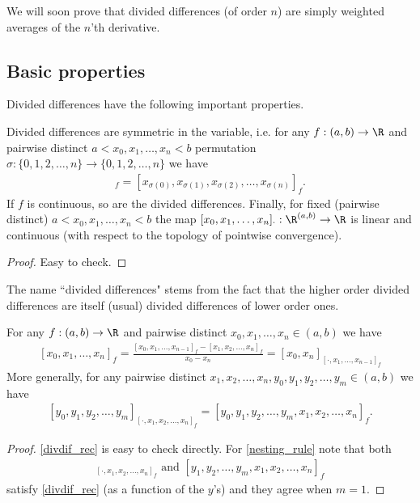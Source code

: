 We will soon prove that divided differences (of order $n$) are simply weighted averages of the $n$'th derivative.

\subsection{Basic properties}

Divided differences have the following important properties.

\begin{prop}
	Divided differences are symmetric in the variable, i.e. for any $f : (a, b) \to \R$ and pairwise distinct $a < x_{0}, x_{1}, \ldots, x_{n} < b$ permutation $\sigma : \{0, 1, 2, \ldots, n\} \to \{0, 1, 2, \ldots, n\}$ we have
	\begin{align*}
		[x_{0}, x_{1}, x_{2}, \ldots, x_{n}]_{f} = [x_{\sigma(0)}, x_{\sigma(1)}, x_{\sigma(2)}, \ldots, x_{\sigma(n)}]_{f}.
	\end{align*}
	If $f$ is continuous, so are the divided differences.
	Finally, for fixed (pairwise distinct) $a < x_{0}, x_{1}, \ldots, x_{n} < b$ the map $[x_{0}, x_{1}, \ldots, x_{n}]_{\cdot} : \R^{(a, b)} \to \R$ is linear and continuous (with respect to the topology of pointwise convergence).
\end{prop}
\begin{proof}
	Easy to check.
\end{proof}

The name ``divided differences" stems from the fact that the higher order divided differences are itself (usual) divided differences of lower order ones.

\begin{prop}\label{nesting_property}
	For any $f : (a, b) \to \R$ and pairwise distinct $x_{0}, x_{1}, \ldots, x_{n} \in (a, b)$ we have
	\begin{align}\label{divdif_rec}
		[x_{0}, x_{1}, \ldots, x_{n}]_{f} = \frac{[x_{0}, x_{1}, \ldots, x_{n - 1}]_{f} - [x_{1}, x_{2}, \ldots, x_{n}]_{f}}{x_{0} - x_{n}} = [x_{0}, x_{n}]_{[\cdot, x_{1}, \ldots, x_{n - 1}]_f}
	\end{align}
	More generally, for any pairwise distinct $x_{1}, x_{2}, \ldots, x_{n}, y_{0}, y_{1}, y_{2}, \ldots, y_{m} \in (a, b)$ we have
	\begin{align}\label{nesting_rule}
		[y_{0}, y_{1}, y_{2}, \ldots, y_{m}]_{[\cdot, x_{1}, x_{2}, \ldots, x_{n}]_{f}} = [y_{0}, y_{1}, y_{2}, \ldots, y_{m}, x_{1}, x_{2}, \ldots, x_{n}]_{f}.
	\end{align}
\end{prop}
\begin{proof}
	\ref{divdif_rec} is easy to check directly. For \ref{nesting_rule} note that both
	\begin{align*}
		[y_{1}, y_{2}, \ldots, y_{m}]_{[\cdot, x_{1}, x_{2}, \ldots, x_{n}]_{f}} \text{ and } [y_{1}, y_{2}, \ldots, y_{m}, x_{1}, x_{2}, \ldots, x_{n}]_{f}
	\end{align*}
	satisfy \ref{divdif_rec} (as a function of the $y$'s) and they agree when $m = 1$.
\end{proof}

